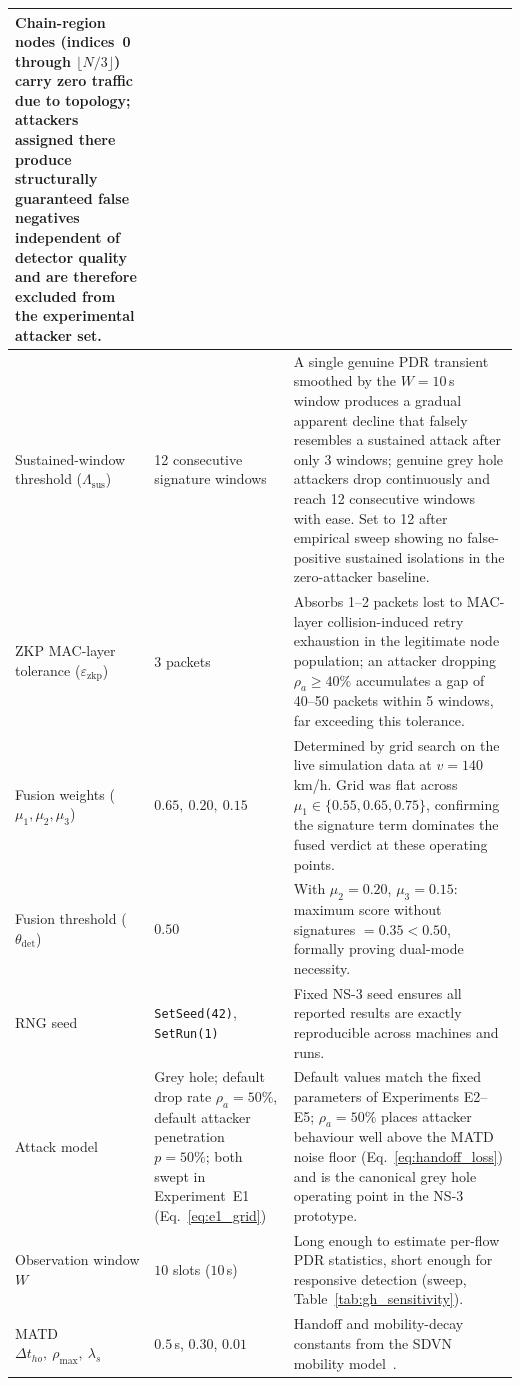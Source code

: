 \documentclass[12pt, a4paper]{report}
\begin{document}
{\begin{longtable}{| p{3.0cm} | p{4.3cm} | p{6.0cm} |}
Chain-region nodes (indices~0 through $\lfloor N/3\rfloor$)
carry zero traffic due to topology; attackers assigned there
produce structurally guaranteed false negatives independent of
detector quality and are therefore excluded from the
experimental attacker set. \\
\hline
Sustained-window threshold ($\Lambda_{\mathrm{sus}}$) & 12
consecutive signature windows &
A single genuine PDR transient smoothed by the $W=10$\,s
window produces a gradual apparent decline that falsely
resembles a sustained attack after only 3 windows; genuine
grey hole attackers drop continuously and reach 12 consecutive
windows with ease. Set to 12 after empirical sweep showing no
false-positive sustained isolations in the zero-attacker
baseline. \\
\hline
ZKP MAC-layer tolerance ($\varepsilon_{\mathrm{zkp}}$) & 3 packets &
Absorbs 1--2 packets lost to MAC-layer collision-induced retry
exhaustion in the legitimate node population; an attacker
dropping $\rho_a \geq 40\%$ accumulates a gap of 40--50
packets within 5 windows, far exceeding this tolerance. \\
\hline
Fusion weights ($\mu_1, \mu_2, \mu_3$) & $0.65,\ 0.20,\ 0.15$ &
Determined by grid search on the live simulation data at $v=140$\,km/h.
Grid was flat across $\mu_1 \in \{0.55, 0.65, 0.75\}$, confirming
the signature term dominates the fused verdict at these operating
points. \\
\hline
Fusion threshold ($\theta_{\mathrm{det}}$) & $0.50$ &
With $\mu_2=0.20$, $\mu_3=0.15$: maximum score without signatures
$= 0.35 < 0.50$, formally proving dual-mode necessity. \\
\hline
RNG seed & \texttt{SetSeed(42)}, \texttt{SetRun(1)} &
Fixed NS-3 seed ensures all reported results are exactly
reproducible across machines and runs. \\
\hline
Attack model & Grey hole; default drop rate $\rho_a = 50\%$,
default attacker penetration $p = 50\%$; both swept
in Experiment~E1 (Eq.~\eqref{eq:e1_grid}) &
Default values match the fixed parameters of Experiments
E2--E5; $\rho_a = 50\%$ places attacker behaviour well above the
MATD noise floor (Eq.~\eqref{eq:handoff_loss}) and is the
canonical grey hole operating point in the NS-3 prototype. \\
\hline
Observation window $W$ & $10$ slots ($10$\,s) & Long enough to estimate per-flow PDR statistics, short enough for responsive detection (sweep, Table~\ref{tab:gh_sensitivity}). \\
\hline
MATD $\Delta t_{ho},\ \rho_{\max},\ \lambda_s$ & $0.5$\,s, $0.30$, $0.01$ & Handoff and mobility-decay constants from the SDVN mobility model~\cite{islam2021sdvn}. \\

\end{longtable}}
\end{document}

